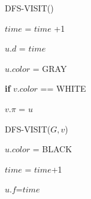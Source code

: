 \begin{minipage}{.7\textwidth}

\begin{algorithm} [H]

\renewcommand{\thealgorithm}{}

DFS-VISIT()

$\displaystyle{time}$ = $\displaystyle{time}$ +1

$\displaystyle{u.d}$ = $\displaystyle{time}$

$\displaystyle{u.color}$ = GRAY

 {
    
    \textbf{if} {$\displaystyle{v.color}$ == WHITE}{
        
        $\displaystyle{v. \pi}$ = $\displaystyle{u}$
        
         DFS-VISIT($\displaystyle{G,v}$)
        }
        
    }
    
$\displaystyle{u.color}$ = BLACK

$\displaystyle{time}$ = $\displaystyle{time}$+1

$\displaystyle{u.f}$=$\displaystyle{time}$

\end{algorithm}
\end{minipage}